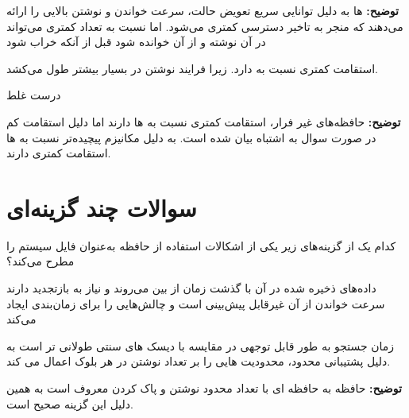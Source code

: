 \documentclass[12pt]{exam}
\begin{document}
\begin{questions}
	\textbf{توضیح:}  ها به دلیل توانایی سریع تعویض حالت، سرعت خواندن و نوشتن بالایی را ارائه می‌دهند که منجر به تاخیر دسترسی کمتری می‌شود. اما نسبت به  تعداد کمتری می‌تواند در آن نوشته و از آن خوانده شود قبل از آنکه خراب شود
	
	
	\printanswers
	\question
	 استقامت کمتری نسبت به  دارد. زیرا فرایند نوشتن در  بسیار بیشتر طول می‌کشد.
	
	\begin{checkboxes}
		\choice درست
		\CorrectChoice غلط
	\end{checkboxes}
	
	\textbf{توضیح:} حافظه‌های غیر فرار، استقامت کمتری نسبت به  ها دارند اما دلیل استقامت کم در صورت سوال به اشتباه بیان شده است. به دلیل مکانیزم پیچیده‌تر نسبت به  ها استقامت کمتری دارند.
	
	
	
	
	
	
	
	
	
	
	
	
	
	
	\section{سوالات چند گزینه‌ای}
	\printanswers
	\question
	کدام یک از گزینه‌های زیر یکی از اشکالات استفاده از حافظه  به‌عنوان فایل سیستم را مطرح می‌کند؟
	
	\begin{checkboxes}
		\choice داده‌های ذخیره شده در آن با گذشت زمان از بین می‌روند و نیاز به بازتجدید دارند
		\choice سرعت خواندن از آن غیرقابل پیش‌بینی است و چالش‌هایی را برای زمان‌بندی  ایجاد می‌کند
		\item زمان جستجو به طور قابل توجهی در مقایسه با دیسک های سنتی طولانی تر است
		\CorrectChoice به دلیل پشتیبانی محدود، محدودیت هایی را بر تعداد نوشتن در هر بلوک اعمال می کند.
	\end{checkboxes}
	
	\textbf{توضیح:} حافظه  به حافظه ای با تعداد محدود نوشتن و پاک کردن  معروف است به همین دلیل این گزینه صحیح است.
	
	
	








\end{questions}
\end{document}
